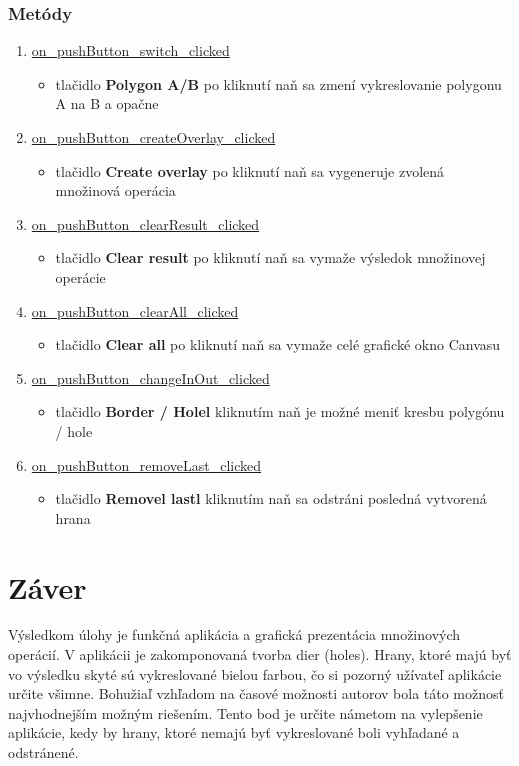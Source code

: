 \documentclass[12pt]{article}
\begin{document}
\subsubsection{Metódy}
\begin{enumerate}
\item[] \underline{on\_pushButton\_switch\_clicked}
\begin{itemize}
\item tlačidlo \textbf{Polygon A/B} po kliknutí naň sa zmení vykreslovanie polygonu A na B a opačne
\end{itemize}

\item[] \underline{on\_pushButton\_createOverlay\_clicked}
\begin{itemize}
\item tlačidlo \textbf{Create overlay}  po kliknutí naň sa vygeneruje zvolená množinová operácia
\end{itemize}

\item[] \underline{on\_pushButton\_clearResult\_clicked}
\begin{itemize}
\item tlačidlo \textbf{Clear result}  po kliknutí naň sa vymaže výsledok množinovej operácie
\end{itemize}
\item[] \underline{on\_pushButton\_clearAll\_clicked}
\begin{itemize}
\item tlačidlo \textbf{Clear all}  po kliknutí naň sa vymaže celé grafické okno Canvasu
\end{itemize}
\item[] \underline{on\_pushButton\_changeInOut\_clicked}
\begin{itemize}
\item tlačidlo \textbf{Border / Holel}  kliknutím naň je možné meniť kresbu polygónu / hole
\end{itemize}
\item[] \underline{on\_pushButton\_removeLast\_clicked}
\begin{itemize}
\item tlačidlo \textbf{Removel lastl}  kliknutím naň sa odstráni posledná vytvorená hrana
\end{itemize}
\end{enumerate}


\clearpage
\section{Záver}
Výsledkom úlohy je funkčná aplikácia a grafická prezentácia množinových operácií. V aplikácii je zakomponovaná tvorba dier (holes). Hrany, ktoré majú byť vo výsledku skyté sú vykreslované bielou farbou, čo si pozorný užívateľ aplikácie určite všimne. Bohužiaľ vzhľadom na časové možnosti autorov bola táto možnosť najvhodnejším možným riešením. Tento bod je určite námetom na vylepšenie aplikácie, kedy by hrany, ktoré nemajú byť vykreslované boli vyhľadané a odstránené.
\end{document}
